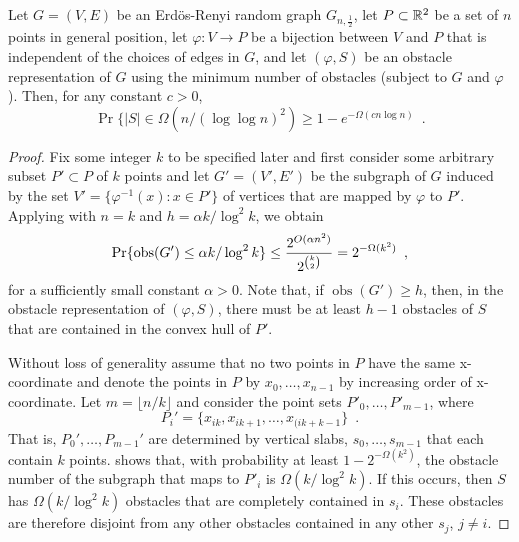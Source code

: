 \documentclass{patmorin}
\DeclareMathOperator{\obs}{obs}
\begin{document}
\begin{lem}
  Let $G=(V,E)$ be an Erd\"os-Renyi random graph $G_{n,\frac{1}{2}}$,
  let $P\subset\mathbb{R}^2$ be a set of $n$ points in general position, let
  $\varphi:V\rightarrow P$ be a bijection between $V$ and $P$ that is
  independent of the choices of edges in $G$, and let $(\varphi, S)$ be
  an obstacle representation of $G$ using the minimum number of obstacles
  (subject to $G$ and $\varphi$).  Then, for any constant $c>0$,
  \[
     \Pr\{|S| \in \Omega(n/(\log\log n)^2) \ge 1-e^{-\Omega(cn\log n)}  \enspace .
  \] 
\end{lem}

\begin{proof}
Fix some integer $k$ to be specified later and first consider some
arbitrary subset $P'\subset P$ of $k$ points and let $G'=(V',E')$
be the subgraph of $G$ induced by the set $V'=\{\varphi^{-1}(x):x\in
P'\}$ of vertices that are mapped by $\varphi$ to $P'$.  Applying
 with $n=k$ and $h=\alpha k/\log^2 k$, we obtain
\begin{equation}
     \Pr\{\obs(G') \le \alpha k/\log^2 k\} 
       \le \frac{2^{O(\alpha n^2)}}{2^{\binom{k}{2}}}
       = 2^{-\Omega(k^2)} \enspace , \eqlabel{g1}
\end{equation}
for a sufficiently small constant $\alpha > 0$.  Note that, if
$\obs(G')\ge h$, then, in the obstacle representation of $(\varphi,S)$,
there must be at least $h-1$ obstacles of $S$ that are contained in the
convex hull of $P'$.

Without loss of generality assume that no two points in $P$ have the
same x-coordinate and denote the points in $P$ by $x_0,\ldots,x_{n-1}$
by increasing order of x-coordinate.  Let $m=\lfloor n/k\rfloor$ and
consider the point sets $P'_0,\ldots,P'_{m-1}$, where
\[ 
  P_i'=\{x_{ik},x_{ik+1},\ldots,x_{(ik+k-1}\} \enspace .
\]  
That is, $P_0',\ldots,P_{m-1}'$ are determined by vertical slabs,
$s_0,\ldots,s_{m-1}$ that each contain $k$ points.   shows
that, with probability at least $1-2^{-\Omega(k^2)}$, the obstacle
number of the subgraph that maps to $P'_i$ is $\Omega(k/\log^2 k)$.
If this occurs, then $S$ has $\Omega(k/\log^2 k)$ obstacles that are
completely contained in $s_i$.  These obstacles are therefore disjoint
from any other obstacles contained in any other $s_j$, $j\neq i$.


\end{proof}
\end{document}
